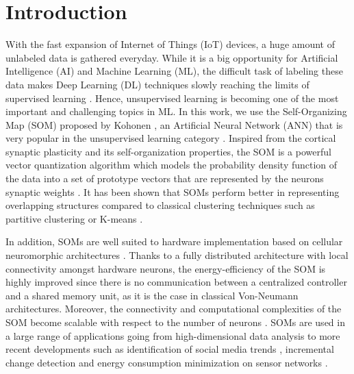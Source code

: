 \documentclass[runningheads]{llncs}
\begin{document}
\section{Introduction}
With the fast expansion of Internet of Things (IoT) devices, a huge amount of unlabeled data is gathered everyday. While it is a big opportunity for Artificial Intelligence (AI) and Machine Learning (ML), the difficult task of labeling these data makes Deep Learning (DL) techniques slowly reaching the limits of supervised learning \cite{droniou2015multimodal_perception,chum2019beyond_supervised}. Hence, unsupervised learning is becoming one of the most important and challenging topics in ML.
In this work, we use the Self-Organizing Map (SOM) proposed by Kohonen \cite{kohonen1990som}, an Artificial Neural Network (ANN) that is very popular in the unsupervised learning category \cite{kohonen2001som}. Inspired from the cortical synaptic plasticity and its self-organization properties, the SOM is a powerful vector quantization algorithm which models the probability density function of the data into a set of prototype vectors that are represented by the neurons synaptic weights \cite{rougier2011dsom}.
It has been shown that SOMs perform better in representing overlapping structures compared to classical clustering techniques such as partitive clustering or K-means \cite{budayan2009cluster_vs_som}. 

In addition, SOMs are well suited to hardware implementation based on cellular neuromorphic architectures \cite{sousa2017embedded_som, khacef2018neuromorphic_hardware,rodriguez2018grid_som}. Thanks to a fully distributed architecture with local connectivity amongst hardware neurons, the energy-efficiency of the SOM is highly improved since there is no communication between a centralized controller and a shared memory unit, as it is the case in classical Von-Neumann architectures. Moreover, the connectivity and computational complexities of the SOM become scalable with respect to the number of neurons \cite{rodriguez2018grid_som}. SOMs are used in a large range of applications \cite{kohonen1996som_app} going from high-dimensional data analysis to more recent developments such as identification of social media trends \cite{silva2018social_media}, incremental change detection \cite{nallaperuma2018bahavior_changes} and energy consumption minimization on sensor networks \cite{kromes2019lorawan}.
\end{document}
